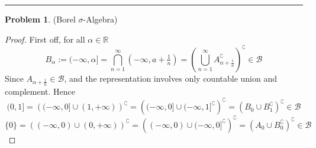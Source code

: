 \documentclass[a4paper, 10pt]{article}
\theoremstyle{definition}
\newtheorem{problem}{Problem}
\theoremstyle{hSol}
\begin{document}
\noindent\rule{16cm}{0.4pt}
\begin{problem} (Borel $\sigma$-Algebra)
\end{problem}
\begin{proof} First off, for all $\alpha \in \mathbb{R}$
$$
B_{\alpha} := (-\infty, \alpha]  = \bigcap_{n = 1}^{\infty} (-\infty, a+\tfrac{1}{n}) = \left(\bigcup_{n =1}^{\infty} A_{\alpha + \frac{1}{n}}^{\complement} \right)^{\complement} \in \mathcal{B}
$$
Since $A_{\alpha + \frac{1}{n}} \in \mathcal{B}$, and the representation involves only countable union and complement. Hence
$$
(0,1] = \left((-\infty, 0] \cup (1, +\infty)\right)^{\complement} = \left((-\infty, 0] \cup (-\infty,1]^{\complement}\right)^{\complement} = (B_{0}\cup B_1^{\complement})^{\complement} \in \mathcal{B}
$$
$$
\{0\} = \left((-\infty, 0) \cup (0, +\infty)\right)^{\complement} = \left((-\infty, 0) \cup (-\infty,0]^{\complement}\right)^{\complement} = (A_{0}\cup B_0^{\complement})^{\complement} \in \mathcal{B}
$$
\end{proof}
\end{document}
